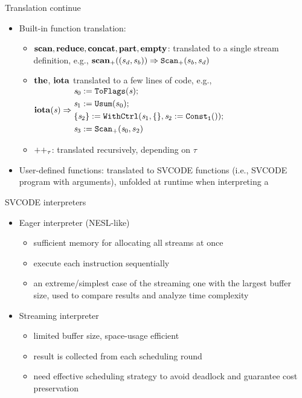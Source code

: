 \documentclass{beamer}
\begin{document}
\begin{frame}{Translation continue}
	\begin{itemize}
		 \item Built-in function translation: 
		\begin{itemize}
			\item $\*{scan}, \*{reduce}, \*{concat}, \*{part}, \*{empty}$: translated to a single stream definition, e.g., 
			${\*{scan}_+}{((s_d,s_b))} \Ra {\genscan_{+}(s_b,s_d)}$
			\item $\*{the}$, $\*{iota}$ translated to a few lines of code, e.g.,
			$\iota{\s} \Ra 
			 \begin{aligned}
			 & \sdef{\s_0}{\toflag(\s)} ; \\ 
			 & \sdef{\s_1}{\usum(s_0)} ; \\
			 & \withctrl{\s_1}{\sdef{\s_2}{\consta{1}()}}{\{\}}{\{\s_2\}}; \\
			 & \sdef{\s_3}{\genscan_{+}(\s_0,s_2)}
			 \end{aligned}$
			 
			\item $\*{++}_{\tau}$: translated recursively, depending on $\tau$

		\end{itemize}
		\item User-defined functions: translated to SVCODE functions (i.e., SVCODE program with arguments), unfolded at runtime when interpreting a \sc 
	\end{itemize}
\end{frame}

\begin{frame}{SVCODE interpreters}
\begin{itemize}
	\item Eager interpreter (NESL-like) 
	\begin{itemize}
		\item sufficient memory for allocating all streams at once
		\item execute each instruction sequentially 
		\item an extreme/simplest case of the streaming one with the largest buffer size, used to compare results and analyze time complexity 
	\end{itemize}
	\item Streaming interpreter
	\begin{itemize}
		\item limited buffer size, space-usage efficient
		\item result is collected from  each scheduling round
		\item need effective scheduling strategy to avoid deadlock and guarantee cost preservation
	\end{itemize} 
	
\end{itemize}
\end{frame}
\end{document}
